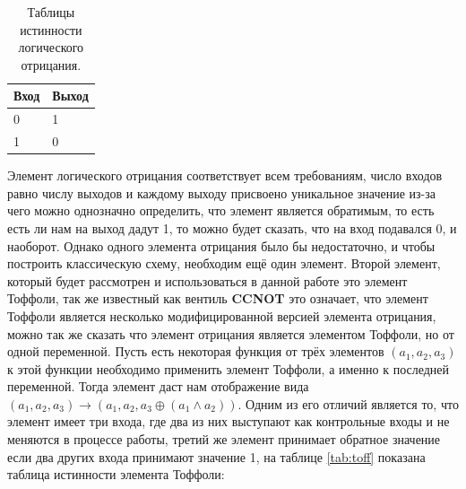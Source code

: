 \documentclass[14pt]{extarticle} %
\begin{document}
 \begin{table}[h]
	\centering
	\caption{Таблицы истинности логического отрицания.}
	\footnotesize
	\label{cccccc}
	\begin{tabular}{|l|l|}
		\hline
		Вход & Выход \\ \hline
		0    & 1     \\ \hline
		1    & 0     \\ \hline
	\end{tabular}
\end{table}
Элемент логического отрицания соответствует всем требованиям, число входов равно числу выходов и каждому выходу присвоено уникальное значение из-за чего можно однозначно определить, что элемент является обратимым, то есть есть ли нам на выход дадут 1, то можно будет сказать, что на вход подавался 0, и наоборот. Однако одного элемента отрицания было бы недостаточно, и чтобы построить классическую схему, необходим ещё один элемент. 
Второй элемент, который будет рассмотрен и использоваться в данной работе это элемент Тоффоли, так же известный как вентиль \textbf{CCNOT} это означает, что элемент Тоффоли является несколько модифицированной версией элемента отрицания, можно так же сказать что элемент отрицания является элементом Тоффоли, но от одной переменной. Пусть есть некоторая функция от трёх элементов $(a_{1}, a_{2}, a_{3})$ к этой функции необходимо применить элемент Тоффоли, а именно к последней переменной. Тогда элемент даст нам отображение вида $(a_{1}, a_{2}, a_{3}) \rightarrow  (a_{1}, a_{2}, a_{3}\oplus(a_{1}\wedge a_{2}))$.
Одним из его отличий является то, что элемент имеет три входа, где два из них выступают как контрольные входы и не меняются в процессе работы, третий же элемент принимает обратное значение если два других входа принимают значение 1, на таблице \ref{tab:toff} показана таблица истинности элемента Тоффоли:
\end{document}
